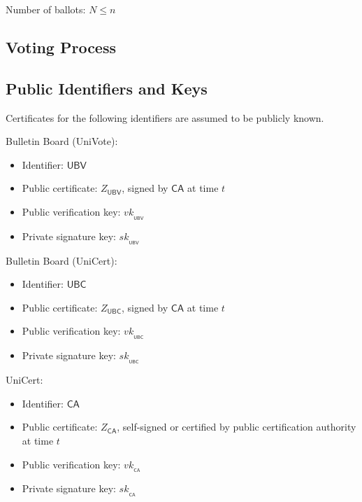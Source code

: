 \documentclass[bibtotoc,halfparskip,oneside]{scrreprt}
\newcommand{\sk}[1]{\mathit{sk}_{#1}\xspace}
\newcommand{\vk}[1]{\mathit{vk}_{#1}\xspace}
\newcommand{\SK}[1]{\sk{_#1}\xspace}
\newcommand{\VK}[1]{\vk{_#1}\xspace}
\newcommand{\CA}{\ensuremath{\mathsf{CA}}\xspace}
\newcommand{\UBC}{\ensuremath{\mathsf{UBC}}\xspace}
\newcommand{\UBV}{\ensuremath{\mathsf{UBV}}\xspace}
\begin{document}
	Number of ballots: $N\leq n$
	
	\subsection{Voting Process}
	
	\subsection{Public Identifiers and Keys}
	
	Certificates for the following identifiers are assumed to be publicly known.
	
	Bulletin Board (UniVote):
	\begin{itemize}
		\item Identifier: \UBV
		\item Public certificate: $Z_{\UBV}$, signed by \CA at time $t$
		\item Public verification key: $\VK{\UBV}$ 
		\item Private signature key: $\SK{\UBV}$
	\end{itemize}
	
	Bulletin Board (UniCert):
	\begin{itemize}
		\item Identifier: \UBC
		\item Public certificate: $Z_{\UBC}$, signed by \CA at time $t$
		\item Public verification key: $\VK{\UBC}$ 
		\item Private signature key: $\SK{\UBC}$
	\end{itemize}
	
	
	UniCert:
	\begin{itemize}
		\item Identifier: \CA
		\item Public certificate: $Z_{\CA}$, self-signed or certified by public certification authority at time $t$
		\item Public verification key: $\VK{\CA}$
		\item Private signature key: $\SK{\CA}$
	\end{itemize}
	
\end{document}
